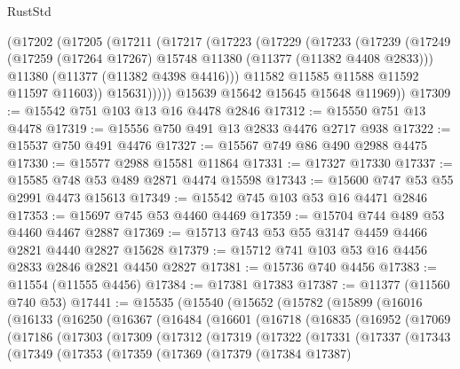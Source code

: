 \begin{lexlean}{RustStd}
\begin{coremodule}
      (@17202
        (@17205
          (@17211
            (@17217
              (@17223
                (@17229
                  (@17233
                    (@17239
                      (@17249
                        (@17259 (@17264 @17267) @15748 @11380 (@11377 (@11382 @4408 @2833)))
                        @11380
                        (@11377 (@11382 @4398 @4416)))
                      @11582
                      @11585
                      @11588
                      @11592
                      @11597
                      @11603))
                  @15631)))))
        @15639
        @15642
        @15645
        @15648
        @11969))
@17309 := @15542 @751 @103 @13 @16 @4478 @2846
@17312 := @15550 @751 @13 @4478
@17319 := @15556 @750 @491 @13 @2833 @4476 @2717 @938
@17322 := @15537 @750 @491 @4476
@17327 := @15567 @749 @86 @490 @2988 @4475
@17330 := @15577 @2988 @15581 @11864
@17331 := @17327 @17330
@17337 := @15585 @748 @53 @489 @2871 @4474 @15598
@17343 := @15600 @747 @53 @55 @2991 @4473 @15613
@17349 := @15542 @745 @103 @53 @16 @4471 @2846
@17353 := @15697 @745 @53 @4460 @4469
@17359 := @15704 @744 @489 @53 @4460 @4467 @2887
@17369 := @15713 @743 @53 @55 @3147 @4459 @4466 @2821 @4440 @2827 @15628
@17379 := @15712 @741 @103 @53 @16 @4456 @2833 @2846 @2821 @4450 @2827
@17381 := @15736 @740 @4456
@17383 := @11554 (@11555 @4456)
@17384 := @17381 @17383
@17387 := @11377 (@11560 @740 @53)
@17441 := @15535
    (@15540
      (@15652
        (@15782
          (@15899
            (@16016
              (@16133
                (@16250
                  (@16367
                    (@16484
                      (@16601
                        (@16718
                          (@16835
                            (@16952
                              (@17069
                                (@17186
                                  (@17303
                                    (@17309
                                      (@17312
                                        (@17319
                                          (@17322
                                            (@17331
                                              (@17337
                                                (@17343
                                                  (@17349
                                                    (@17353
                                                      (@17359
                                                        (@17369
                                                          (@17379
                                                            (@17384 @17387)

\end{coremodule}
\end{lexlean}
